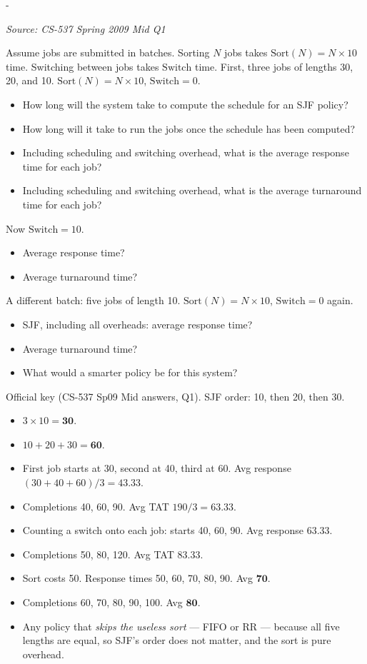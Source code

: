 \documentclass[11pt,a4paper]{article}
\makeatletter
\newcommand{\keepspace}[1]{\par\penalty-100\begingroup
  \setlength{\dimen@}{#1}\dimen@ii\pagegoal\advance\dimen@ii-\pagetotal
  \ifdim\dimen@>\dimen@ii\ifdim\dimen@ii>\z@\vfil\fi\break\fi\endgroup}
\newcounter{qn}[section]
\newenvironment{Qn}[4]{%
  \refstepcounter{qn}\keepspace{7\baselineskip}%
  \begin{tcolorbox}[qboxstyle, title={Q\thesection.\theqn\ \ [#1 \textbar\ #2]\ \ #4}]%
  {\footnotesize\color{g3}\textit{Source: #3}}\par\smallskip%
}{%
  \end{tcolorbox}%
}
\newenvironment{Sol}{%
  \begin{tcolorbox}[sboxstyle, title={Solution}]%
}{%
  \end{tcolorbox}\vspace{0.35em}%
}
\makeatother
\begin{document}
\begin{Qn}{Medium-Hard}{Lect 5--6}{CS-537 Spring 2009 Mid Q1}{SJF with an expensive sort and a switch cost}
Assume jobs are submitted in batches. Sorting $N$ jobs takes $\mathrm{Sort}(N)=N\times 10$ time. Switching between jobs takes $\mathrm{Switch}$ time. First, three jobs of lengths 30, 20, and 10. $\mathrm{Sort}(N)=N\times 10$, $\mathrm{Switch}=0$.
\begin{itemize}
  \item[(a)] How long will the system take to compute the schedule for an SJF policy?
  \item[(b)] How long will it take to run the jobs once the schedule has been computed?
  \item[(c)] Including scheduling and switching overhead, what is the average response time for each job?
  \item[(d)] Including scheduling and switching overhead, what is the average turnaround time for each job?
\end{itemize}
Now $\mathrm{Switch}=10$.
\begin{itemize}
  \item[(e)] Average response time?
  \item[(f)] Average turnaround time?
\end{itemize}
A different batch: five jobs of length 10. $\mathrm{Sort}(N)=N\times 10$, $\mathrm{Switch}=0$ again.
\begin{itemize}
  \item[(g)] SJF, including all overheads: average response time?
  \item[(h)] Average turnaround time?
  \item[(i)] What would a smarter policy be for this system?
\end{itemize}
\end{Qn}
\begin{Sol}
Official key (CS-537 Sp09 Mid answers, Q1). SJF order: 10, then 20, then 30.
\begin{itemize}
  \item[(a)] $3\times 10=\mathbf{30}$.
  \item[(b)] $10+20+30=\mathbf{60}$.
  \item[(c)] First job starts at 30, second at 40, third at 60. Avg response $(30+40+60)/3=\mathbf{43.33}$.
  \item[(d)] Completions 40, 60, 90. Avg TAT $190/3=\mathbf{63.33}$.
  \item[(e)] Counting a switch onto each job: starts 40, 60, 90. Avg response $\mathbf{63.33}$.
  \item[(f)] Completions 50, 80, 120. Avg TAT $\mathbf{83.33}$.
  \item[(g)] Sort costs 50. Response times 50, 60, 70, 80, 90. Avg $\mathbf{70}$.
  \item[(h)] Completions 60, 70, 80, 90, 100. Avg $\mathbf{80}$.
  \item[(i)] Any policy that \emph{skips the useless sort} --- FIFO or RR --- because all five lengths are equal, so SJF's order does not matter, and the sort is pure overhead.
\end{itemize}
\end{Sol}
\end{document}
